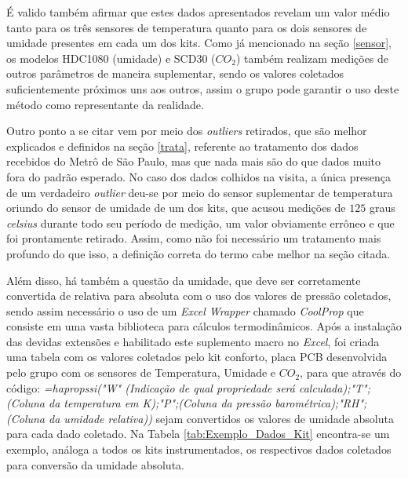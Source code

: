 \documentclass[acronym,symbols,table]{fei}
\begin{document}
É valido também afirmar que estes dados apresentados revelam um valor médio tanto para os três sensores de temperatura quanto para os dois sensores de umidade presentes em cada um dos kits. Como já mencionado na seção \ref{sensor}, os modelos HDC1080 (umidade) e SCD30 ($CO_2$) também realizam medições de outros parâmetros de maneira suplementar, sendo os valores coletados suficientemente próximos uns aos outros, assim o grupo pode garantir o uso deste método como representante da realidade. 

Outro ponto a se citar vem por meio dos \textit{outliers} retirados, que são melhor explicados e definidos na seção \ref{trata}, referente ao tratamento dos dados recebidos do Metrô de São Paulo, mas que nada mais são do que dados muito fora do padrão esperado. No caso dos dados colhidos na visita, a única presença de um verdadeiro \textit{outlier} deu-se por meio do sensor suplementar de temperatura oriundo do sensor de umidade de um dos kits, que acusou medições de $125$ graus \textit{celsius} durante todo seu período de medição, um valor obviamente errôneo e que foi prontamente retirado. Assim, como não foi necessário um tratamento mais profundo do que isso, a definição correta do termo cabe melhor na seção citada.

Além disso, há também a questão da umidade, que deve ser corretamente convertida de relativa para absoluta com o uso dos valores de pressão coletados, sendo assim necessário o uso de um \textit{Excel Wrapper} chamado \textit{CoolProp} que consiste em uma vasta biblioteca para cálculos termodinâmicos. Após a instalação das devidas extensões e habilitado este suplemento macro no \textit{Excel}, foi criada uma tabela com os valores coletados pelo kit conforto, placa PCB desenvolvida pelo grupo com os sensores de Temperatura, Umidade e $CO_2$, para que através do código:
\textit{=hapropssi("W" (Indicação de qual propriedade será calculada);"T";(Coluna da temperatura em K);"P";(Coluna da pressão barométrica);"RH";(Coluna da umidade relativa))} sejam convertidos os valores de umidade absoluta para cada dado coletado. Na Tabela \ref{tab:Exemplo_Dados_Kit} encontra-se um exemplo, análoga a todos os kits instrumentados, os respectivos dados coletados para conversão da umidade absoluta. 
\end{document}
